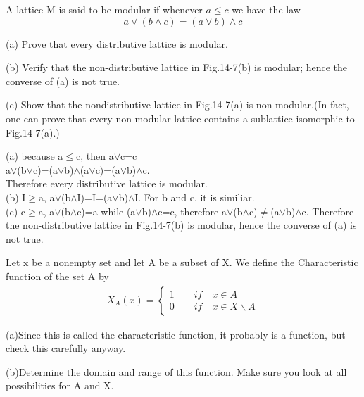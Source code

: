 \documentclass[11pt, a4paper, UTF8]{ctexart}
\begin{document}
\begin{problem}[SM: 14.75]
A lattice M is said to be modular if whenever \(a \leq c\) we have the law
\[a \vee (b \wedge c) = (a \vee b) \wedge c\]

(a) Prove that every distributive lattice is modular.

(b) Verify that the non-distributive lattice in Fig.14-7(b) is modular; hence the converse of (a) is not true.

(c) Show that the nondistributive lattice in Fig.14-7(a) is non-modular.(In fact, one can prove that every non-modular lattice contains a sublattice isomorphic to Fig.14-7(a).)
\end{problem}
\begin{solution}
(a) because a$\le$c, then a$\vee$c=c\\
a$\vee$(b$\vee$c)=(a$\vee$b)$\wedge$(a$\vee$c)=(a$\vee$b)$\wedge$c.\\
Therefore every distributive lattice is modular.\\
(b) I$\ge$a, a$\vee$(b$\wedge$I)=I=(a$\vee$b)$\wedge$I. For b and c, it is similiar.\\
(c) c$\ge$a, a$\vee$(b$\wedge$c)=a while (a$\vee$b)$\wedge$c=c, therefore a$\vee$(b$\wedge$c)$\not=$(a$\vee$b)$\wedge$c. Therefore the non-distributive lattice in Fig.14-7(b) is modular, hence the converse of (a) is not true.

\end{solution}








\begincorrection	%

\begin{problem}[UD:13.5]
  Let x be a nonempty set and let A be a subset of X. We define the Characteristic function of the set A by
\begin{align}
X_{A}(x) = 
\begin{cases}
1 \qquad if \quad x \in A\\
0 \qquad if \quad x \in X \backslash A
\end{cases}
\end{align}

(a)Since this is called the characteristic function, it probably is a function, but check this carefully anyway.

(b)Determine the domain and range of this function. Make sure you look at all possibilities for A and X.
\end{problem}
\end{document}
